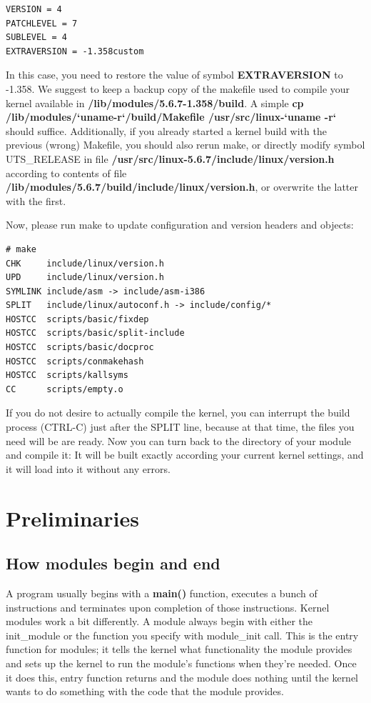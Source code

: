 \documentclass[11pt]{article}
\begin{document}
\begin{verbatim}
VERSION = 4
PATCHLEVEL = 7
SUBLEVEL = 4
EXTRAVERSION = -1.358custom
\end{verbatim}

In this case, you need to restore the value of symbol \textbf{EXTRAVERSION} to -1.358. We suggest to keep a backup copy of the makefile used to compile your kernel available in \textbf{/lib/modules/5.6.7-1.358/build}. A simple \textbf{cp /lib/modules/`uname-r`/build/Makefile /usr/src/linux-`uname -r`} should suffice. Additionally, if you already started a kernel build with the previous (wrong) Makefile, you should also rerun make, or directly modify symbol UTS\_RELEASE in file \textbf{/usr/src/linux-5.6.7/include/linux/version.h} according to contents of file \textbf{/lib/modules/5.6.7/build/include/linux/version.h}, or overwrite the latter with the first.

Now, please run make to update configuration and version headers and objects:

\begin{verbatim}
# make
CHK     include/linux/version.h
UPD     include/linux/version.h
SYMLINK include/asm -> include/asm-i386
SPLIT   include/linux/autoconf.h -> include/config/*
HOSTCC  scripts/basic/fixdep
HOSTCC  scripts/basic/split-include
HOSTCC  scripts/basic/docproc
HOSTCC  scripts/conmakehash
HOSTCC  scripts/kallsyms
CC      scripts/empty.o
\end{verbatim}

If you do not desire to actually compile the kernel, you can interrupt the build process (CTRL-C) just after the SPLIT line, because at that time, the files you need will be are ready. Now you can turn back to the directory of your module and compile it: It will be built exactly according your current kernel settings, and it will load into it without any errors.

\section{Preliminaries}
\label{sec:org8c45a1a}
\subsection{How modules begin and end}
\label{sec:orgb317392}
A program usually begins with a \textbf{main()} function, executes a bunch of instructions and terminates upon completion of those instructions. Kernel modules work a bit differently. A module always begin with either the init\_module or the function you specify with module\_init call. This is the entry function for modules; it tells the kernel what functionality the module provides and sets up the kernel to run the module's functions when they're needed. Once it does this, entry function returns and the module does nothing until the kernel wants to do something with the code that the module provides.
\end{document}
